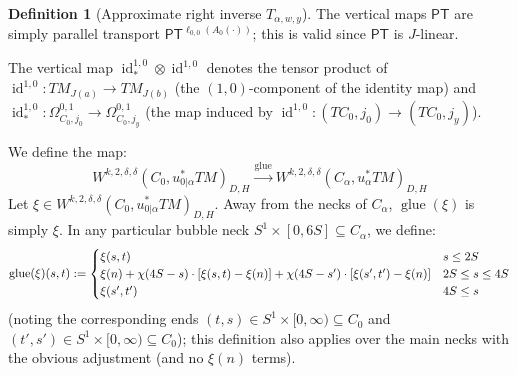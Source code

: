 \documentclass[12pt]{article}
\theoremstyle{definition}
\newtheorem{definition}[theorem]{Definition}
\theoremstyle{remark}
\numberwithin{equation}{subsection}
\newcommand{\PT}{\mathsf{PT}}
\newcommand{\id}{\operatorname{id}}
\begin{document}
\begin{definition}[Approximate right inverse $T_{\alpha,w,y}$]
The vertical maps $\PT$ are simply parallel transport $\PT^{\ell_{0,0}(A_0(\cdot))}$; this is valid since $\PT$ is $J$-linear.

The vertical map $\id^{1,0}_\ast\otimes\id^{1,0}$ denotes the tensor product of $\id^{1,0}:TM_{J(a)}\to TM_{J(b)}$ (the $(1,0)$-component of the identity map) and $\id^{1,0}_\ast:\Omega^{0,1}_{C_0,j_0}\to\Omega^{0,1}_{C_0,j_y}$ (the map induced by $\id^{1,0}:(TC_0,j_0)\to(TC_0,j_y)$).

We define the map:
\begin{equation}
W^{k,2,\delta,\delta}(C_0,u_{0|\alpha}^\ast TM)_{D,H}\xrightarrow{\mathrm{glue}}W^{k,2,\delta,\delta}(C_\alpha,u_\alpha^\ast TM)_{D,H}
\end{equation}
Let $\xi\in W^{k,2,\delta,\delta}(C_0,u_{0|\alpha}^\ast TM)_{D,H}$.  Away from the necks of $C_\alpha$, $\operatorname{glue}(\xi)$ is simply $\xi$.  In any particular bubble neck $S^1\times[0,6S]\subseteq C_\alpha$, we define:
\begin{equation}
\operatorname{glue}(\xi)(s,t):=\begin{cases}
\xi(s,t)&s\leq 2S\cr
\xi(n)+\chi(4S-s)\cdot[\xi(s,t)-\xi(n)]+\chi(4S-s')\cdot[\xi(s',t')-\xi(n)]&2S\leq s\leq 4S\cr
\xi(s',t')&4S\leq s
\end{cases}
\end{equation}
(noting the corresponding ends $(t,s)\in S^1\times[0,\infty)\subseteq C_0$ and $(t',s')\in S^1\times[0,\infty)\subseteq C_0$); this definition also applies over the main necks with the obvious adjustment (and no $\xi(n)$ terms).


\end{definition}
\end{document}
